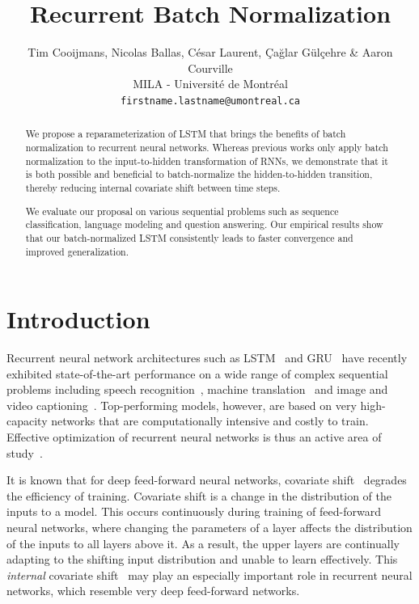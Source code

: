 \documentclass{article} %
\title{Recurrent Batch Normalization}
\author{
Tim Cooijmans, Nicolas Ballas, C\'esar Laurent, Çağlar Gülçehre \& Aaron Courville \\
MILA - Universit\'e de Montr\'eal \\
\texttt{firstname.lastname@umontreal.ca} \\
}
\begin{document}
\maketitle

\begin{abstract}
We propose a reparameterization of LSTM that brings the benefits of batch normalization to recurrent neural networks.
Whereas previous works only apply batch normalization to the input-to-hidden transformation of RNNs,
we demonstrate that it is both possible and beneficial to batch-normalize the hidden-to-hidden transition,
thereby reducing internal covariate shift between time steps.

We evaluate our proposal on various sequential problems such as sequence classification, language modeling and question answering.
Our empirical results show that our batch-normalized LSTM consistently leads to faster convergence and improved generalization.
\end{abstract}

\section{Introduction}

Recurrent neural network architectures such as LSTM~\citep{lstm} and GRU~\citep{cho2014learning} have recently exhibited
state-of-the-art performance on a wide range of complex sequential problems including speech recognition~\cite{baidu},
machine translation~\citep{bahdanau2014neural} and image and video captioning~\citep{xu2015show,yao2015describing}.
Top-performing models, however, are based on very high-capacity networks that are computationally intensive and costly to train.
Effective optimization of recurrent neural networks is thus an active area of study~\citep{pascanudifficulty,hessianfree,ollivier}.

It is known that for deep feed-forward neural networks, covariate shift~\citep{shimodaira2000improving,batchnorm}
degrades the efficiency of training.
Covariate shift is a change in the distribution of the inputs to a model.
This occurs continuously during training of feed-forward neural networks,
where changing the parameters of a layer affects the distribution of the inputs to all layers above it.
As a result, the upper layers are continually adapting to the shifting input distribution and unable to learn effectively.
This \emph{internal} covariate shift~\citep{batchnorm} may play an especially important role in recurrent neural networks,
which resemble very deep feed-forward networks.
\end{document}
